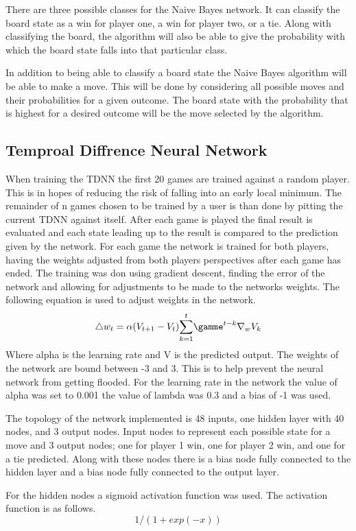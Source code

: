 \documentclass[12pt,letterpaper]{article}
\begin{document}
There are three possible classes for the Naive Bayes network. It can classify the board state as a win for player one, a win for player two, or a tie. Along with classifying the board, the algorithm will also be able to give the probability with which the board state falls into that particular class.

In addition to being able to classify a board state the Naive Bayes algorithm will be able to make a move. This will be done by considering all possible moves and their probabilities for a given outcome. The board state with the probability that is highest for a desired outcome will be the move selected by the algorithm. 

\subsection{Temproal Diffrence Neural Network}
When training the TDNN the first 20 games are trained against a random player. This is in hopes of reducing the risk of falling into an early local minimum. The remainder of n games chosen to be trained by a user is than done by pitting the current TDNN against itself. After each game is played the final result is evaluated and each state leading up to the result is compared to the prediction given by the network. For each game the network is trained for both players, having the weights adjusted from both players perspectives after each game has ended. The training was don using gradient descent, finding the error of the network and allowing for adjustments to be made to the networks weights. The following equation is used to adjust weights in the network. 
\[
{\triangle} w_t = \alpha (V _{t + 1} - V _t)  \overset{t}{\sum_{k = 1}} {\gamme}^{t - k} {\nabla}_w V_k
\]
Where alpha is the learning rate and V is the predicted output. The weights of the network are bound between -3 and 3. This is to help prevent the neural network from getting flooded. For the learning rate in the network the value of alpha was set to 0.001 the value of lambda was 0.3 and a bias of -1 was used. 

The topology of the network implemented is 48 inputs, one hidden layer with 40 nodes, and 3 output nodes. Input nodes to represent each possible state for a move and 3 output nodes; one for player 1 win, one for player 2 win, and one for a tie predicted. Along with these nodes there is a bias node fully connected to the hidden layer and a bias node fully connected to the output layer. 

For the hidden nodes a sigmoid activation function was used. The activation function is as follows. 
\[
1 / (1+exp(-x))
\]
\end{document}

